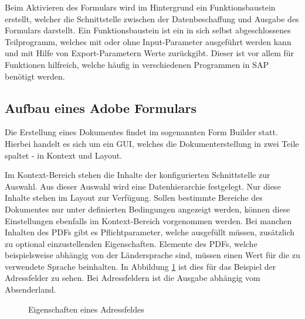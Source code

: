 Beim Aktivieren des Formulars wird im Hintergrund ein Funktionsbaustein erstellt, welcher die Schnittstelle zwischen der Datenbeschaffung und Ausgabe des Formulars darstellt. Ein Funktionsbaustein ist ein in sich selbst abgeschlossenes Teilprogramm, welches mit oder ohne Input-Parameter ausgeführt werden kann und mit Hilfe von Export-Parametern Werte zurückgibt. Dieser ist vor allem für Funktionen hilfreich, welche häufig in verschiedenen Programmen in SAP benötigt werden.

\subsection{Aufbau eines Adobe Formulars}
\label{ch:Aufbau}


Die Erstellung eines Dokumentes findet im sogenannten Form Builder statt. Hierbei handelt es sich um ein \ac{GUI}, welches die Dokumenterstellung in zwei Teile spaltet - in Kontext und Layout. 

Im Kontext-Bereich stehen die Inhalte der konfigurierten Schnittstelle zur Auswahl. Aus dieser Auswahl wird eine Datenhierarchie festgelegt. Nur diese Inhalte stehen im  Layout zur Verfügung. Sollen bestimmte Bereiche des Dokumentes nur unter definierten Bedingungen angezeigt werden, können diese Einstellungen ebenfalls im Kontext-Bereich vorgenommen werden. Bei manchen Inhalten des \ac{PDF}s gibt es Pflichtparameter, welche ausgefüllt müssen, zusätzlich zu optional einzustellenden Eigenschaften.
 Elemente des \ac{PDF}s, welche beispielsweise abhängig von der Ländersprache sind, müssen einen Wert für die zu verwendete Sprache beinhalten. In Abbildung \ref{figAD} ist dies für das Beispiel der Adressfelder zu sehen. Bei Adressfeldern ist die Ausgabe abhängig vom Absenderland.
 
 \begin{figure}[ht]
 	\centering
 	
 	\caption{Eigenschaften eines Adressfeldes}
 	\label{figAD}
 	
 \end{figure}

